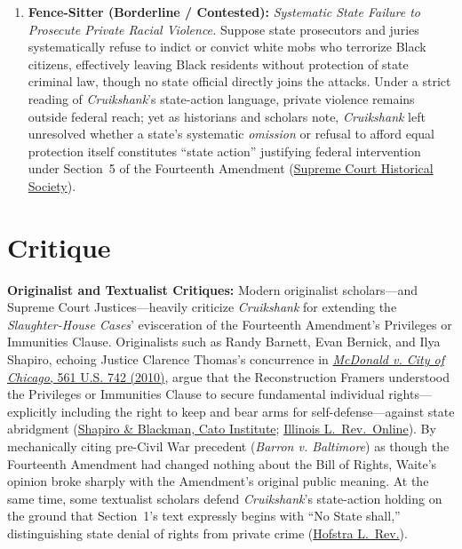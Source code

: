 \documentclass[12pt]{article}
\begin{document}
\begin{enumerate}
    \item \textbf{Fence-Sitter (Borderline / Contested):} \textit{Systematic State Failure to Prosecute Private Racial Violence.} Suppose state prosecutors and juries systematically refuse to indict or convict white mobs who terrorize Black citizens, effectively leaving Black residents without protection of state criminal law, though no state official directly joins the attacks. Under a strict reading of \textit{Cruikshank}'s state-action language, private violence remains outside federal reach; yet as historians and scholars note, \textit{Cruikshank} left unresolved whether a state's systematic \textit{omission} or refusal to afford equal protection itself constitutes ``state action'' justifying federal intervention under Section~5 of the Fourteenth Amendment (\href{https://civics.supremecourthistory.org/article/united-states-v-cruikshank/}{Supreme Court Historical Society}).
\end{enumerate}

\section{Critique}

\textbf{Originalist and Textualist Critiques:} Modern originalist scholars---and Supreme Court Justices---heavily criticize \textit{Cruikshank} for extending the \textit{Slaughter-House Cases}' evisceration of the Fourteenth Amendment's Privileges or Immunities Clause. Originalists such as Randy Barnett, Evan Bernick, and Ilya Shapiro, echoing Justice Clarence Thomas's concurrence in \href{https://www.law.cornell.edu/supct/html/08-1521.ZO.html}{\textit{McDonald v. City of Chicago}, 561 U.S. 742 (2010)}, argue that the Reconstruction Framers understood the Privileges or Immunities Clause to secure fundamental individual rights---explicitly including the right to keep and bear arms for self-defense---against state abridgment (\href{https://www.cato.org/sites/cato.org/files/2020-04/shapiro-blackman-gmlr-priv-imm-clause.pdf}{Shapiro \& Blackman, Cato Institute}; \href{https://illinoislawreview.org/online/what-cruikshank-really-means-for-the-second-amendment/}{Illinois L.~Rev.~Online}). By mechanically citing pre-Civil War precedent (\textit{Barron v. Baltimore}) as though the Fourteenth Amendment had changed nothing about the Bill of Rights, Waite's opinion broke sharply with the Amendment's original public meaning. At the same time, some textualist scholars defend \textit{Cruikshank}'s state-action holding on the ground that Section~1's text expressly begins with ``No State shall,'' distinguishing state denial of rights from private crime (\href{https://law.hofstra.edu/pdf/academics/journals/lawreview/lrv_issues_v34n04_cc2.huhn.final.pdf}{Hofstra L.~Rev.}).
\end{document}
